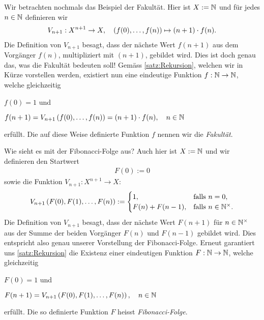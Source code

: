 {
Wir betrachten nochmals das Beispiel der Fakultät. Hier ist $X:=\mathbb{N}$ und für jedes $n\in\mathbb{N}$ definieren wir
\begin{align*}
    V_{n+1}: X^{n+1}\to X, \quad \left(f(0),\ldots,f(n)\right) \mapsto (n+1)\cdot f(n).
\end{align*}
Die Definition von $V_{n+1}$ besagt, dass der nächste Wert $f(n+1)$ aus dem Vorgänger $f(n)$, multipliziert mit $(n+1)$, gebildet wird. Dies ist doch genau das, was die Fakultät bedeuten soll! Gemäss \cref{satz:Rekursion}, welchen wir in Kürze vorstellen werden, existiert nun eine eindeutige Funktion $f:\mathbb{N}\to\mathbb{N}$, welche gleichzeitig
\begin{renum}
    \item $f(0) = 1$ und
    \item $f(n+1) = V_{n+1}\left(f(0),\ldots,f(n)\right) = (n+1)\cdot f(n), \quad n\in\mathbb{N}$
\end{renum}
erfüllt. Die auf diese Weise definierte Funktion $f$ nennen wir die \textit{Fakultät}.
}
{
Wie sieht es mit der Fibonacci-Folge aus? Auch hier ist $X:=\mathbb{N}$ und wir definieren den Startwert
\begin{align*}
    F(0) := 0
\end{align*}
sowie die Funktion $V_{n+1}: X^{n+1}\to X$:
\[
  V_{n+1}\left(F(0),F(1),\ldots,F(n)\right) := 
  \begin{cases}
    1, &\text{falls $n = 0$}, \\
    F(n) + F(n-1), &\text{falls $n\in\mathbb{N}^{\times}$}.
  \end{cases}
\]
Die Definition von $V_{n+1}$ besagt, dass der nächste Wert $F(n+1)$ für $n\in\mathbb{N}^{\times}$ aus der Summe der beiden Vorgänger $F(n)$ und $F(n-1)$ gebildet wird. Dies entspricht also genau unserer Vorstellung der Fibonacci-Folge. Erneut garantiert uns \cref{satz:Rekursion} die Existenz einer eindeutigen Funktion $F:\mathbb{N}\to\mathbb{N}$, welche gleichzeitig
\begin{renum}
    \item $F(0) = 1$ und
    \item $F(n+1) = V_{n+1}\left(F(0),F(1),\ldots,F(n)\right), \quad n\in\mathbb{N}$
\end{renum}
erfüllt. Die so definierte Funktion $F$ heisst \textit{Fibonacci-Folge}.
}
